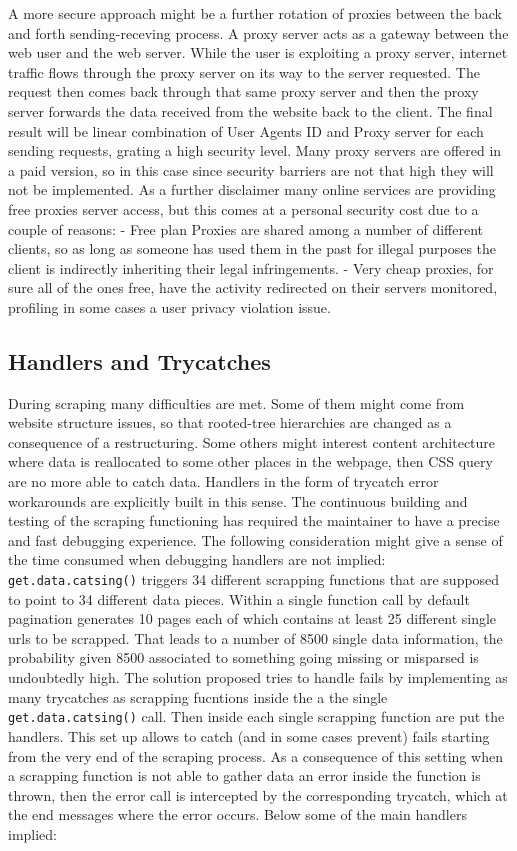 \documentclass[
  12pt,
  a4paper,
  oneside]{book}
\begin{document}
A more secure approach might be a further rotation of proxies between the back and forth sending-receving process. A proxy server acts as a gateway between the web user and the web server.
While the user is exploiting a proxy server, internet traffic flows through the proxy server on its way to the server requested. The request then comes back through that same proxy server and then the proxy server forwards the data received from the website back to the client. The final result will be linear combination of User Agents ID and Proxy server for each sending requests, grating a high security level.
Many proxy servers are offered in a paid version, so in this case since security barriers are not that high they will not be implemented. As a further disclaimer many online services are providing free proxies server access, but this comes at a personal security cost due to a couple of reasons:
- Free plan Proxies are shared among a number of different clients, so as long as someone has used them in the past for illegal purposes the client is indirectly inheriting their legal infringements.
- Very cheap proxies, for sure all of the ones free, have the activity redirected on their servers monitored, profiling in some cases a user privacy violation issue.

\hypertarget{handlers-and-trycatches}{%
\subsection{Handlers and Trycatches}\label{handlers-and-trycatches}}

During scraping many difficulties are met. Some of them might come from website structure issues, so that rooted-tree hierarchies are changed as a consequence of a restructuring. Some others might interest content architecture where data is reallocated to some other places in the webpage, then CSS query are no more able to catch data. Handlers in the form of trycatch error workarounds are explicitly built in this sense. The continuous building and testing of the scraping functioning has required the maintainer to have a precise and fast debugging experience. The following consideration might give a sense of the time consumed when debugging handlers are not implied: \texttt{get.data.catsing()} triggers 34 different scrapping functions that are supposed to point to 34 different data pieces. Within a single function call by default pagination generates 10 pages each of which contains at least 25 different single urls to be scrapped. That leads to a number of 8500 single data information, the probability given 8500 associated to something going missing or misparsed is undoubtedly high.
The solution proposed tries to handle fails by implementing as many trycatches as scrapping fucntions inside the a the single \texttt{get.data.catsing()} call. Then inside each single scrapping function are put the handlers. This set up allows to catch (and in some cases prevent) fails starting from the very end of the scraping process. As a consequence of this setting when a scrapping function is not able to gather data an error inside the function is thrown, then the error call is intercepted by the corresponding trycatch, which at the end messages where the error occurs.
Below some of the main handlers implied:
\end{document}
